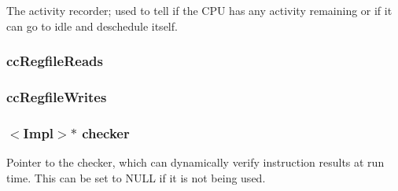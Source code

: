 The activity recorder; used to tell if the CPU has any activity remaining or if it can go to idle and deschedule itself. \hypertarget{classFullO3CPU_a54d1bb817fb61f8ea36ad3b2063f27c6}{
\subsubsection[{ccRegfileReads}]{ {\bf ccRegfileReads}}}
\label{classFullO3CPU_a54d1bb817fb61f8ea36ad3b2063f27c6}
\hypertarget{classFullO3CPU_abd236585eb8f96cd37f7cea04204d456}{
\subsubsection[{ccRegfileWrites}]{ {\bf ccRegfileWrites}}}
\label{classFullO3CPU_abd236585eb8f96cd37f7cea04204d456}
\hypertarget{classFullO3CPU_a85ab02c76c80bbfce7b3ce7981c55f68}{
\subsubsection[{checker}]{$<$Impl$>$$\ast$ {\bf checker}}}
\label{classFullO3CPU_a85ab02c76c80bbfce7b3ce7981c55f68}
Pointer to the checker, which can dynamically verify instruction results at run time. This can be set to NULL if it is not being used. 

